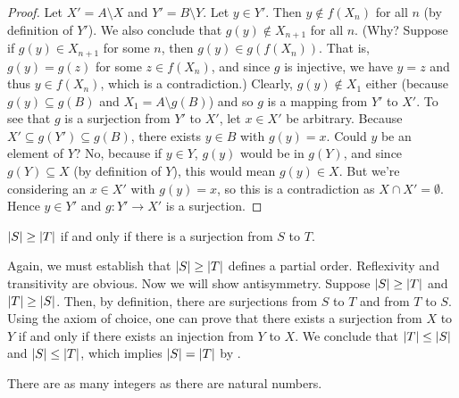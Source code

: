 \documentclass[11pt,twoside=off,numbers=noenddot]{scrbook}
\begin{document}
\begin{proof}
  Let $X' = A \setminus X$ and $Y' = B \setminus Y$. Let $y \in Y'$.
  Then $y \notin f(X_n)$ for all $n$ (by definition of $Y'$). We also
  conclude that $g(y) \notin X_{n + 1}$ for all $n$. (Why? Suppose if
    $g(y) \in X_{n + 1}$ for some $n$, then $g(y) \in g(f(X_n))$. That
    is, $g(y) = g(z)$ for some $z \in f(X_n)$, and since $g$ is
    injective, we have $y = z$ and thus $y \in f(X_n)$, which is a
  contradiction.) Clearly, $g(y) \notin X_1$ either (because $g(y)
  \subseteq g(B)$ and $X_1 = A \setminus g(B)$) and so $g$ is a
  mapping from $Y'$ to $X'$. To see that $g$ is a surjection from
  $Y'$ to $X'$, let $x \in X'$ be arbitrary. Because $X' \subseteq
  g(Y') \subseteq g(B)$, there exists $y \in B$ with $g(y) = x$.
  Could $y$ be an element of $Y$? No, because if $y \in Y$, $g(y)$
  would be in $g(Y)$, and since $g(Y) \subseteq X$ (by definition of
  $Y$), this would mean $g(y) \in X$. But we're considering an $x \in
  X'$ with $g(y) = x$, so this is a contradiction as $X \cap X' =
  \emptyset$. Hence $y \in Y'$ and $g : Y' \to X'$ is a surjection.
\end{proof}

\begin{definition}
  $| S | \geq | T |$ if and only if there is a surjection from $S$ to $T$.
\end{definition}

\begin{remark}
  Again, we must establish that $| S | \geq | T |$ defines a
  partial order. Reflexivity and transitivity are obvious. Now we
  will show antisymmetry. Suppose $| S | \geq | T |$ and
  $| T | \geq | S |$. Then, by definition, there are
  surjections from $S$ to $T$ and from $T$ to $S$. Using the axiom of
  choice, one can prove that there exists a surjection from $X$ to
  $Y$ if and only if there exists an injection from $Y$ to $X$. We
  conclude that $| T | \leq | S |$ and $| S | \leq
  | T |$, which implies $| S | = | T |$ by .
\end{remark}

\begin{theorem}[$\abs{\ZZ} = \abs{\NN}$]
  There are as many integers as there are natural numbers.
\end{theorem}
\end{document}
